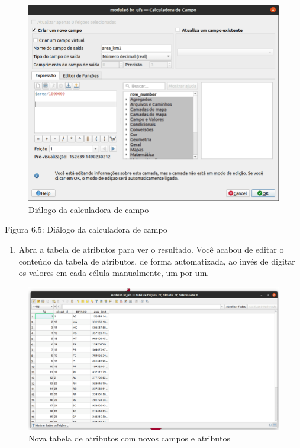 \documentclass[
]{krantz}
\providecommand{\tightlist}{%
  \setlength{\itemsep}{0pt}\setlength{\parskip}{0pt}}
\begin{document}
\begin{figure}
\centering
\includegraphics{media/modulo6/fieldcalc.png}
\caption{Diálogo da calculadora de campo}
\end{figure}

Figura 6.5: Diálogo da calculadora de campo

\begin{enumerate}
\def\labelenumi{\arabic{enumi}.}
\setcounter{enumi}{5}
\tightlist
\item
  Abra a tabela de atributos para ver o resultado. Você acabou de editar o conteúdo da tabela de atributos, de forma automatizada, ao invés de digitar os valores em cada célula manualmente, um por um.
\end{enumerate}

\begin{figure}
\centering
\includegraphics{media/modulo6/area.png}
\caption{Nova tabela de atributos com novos campos e atributos}
\end{figure}
\end{document}
